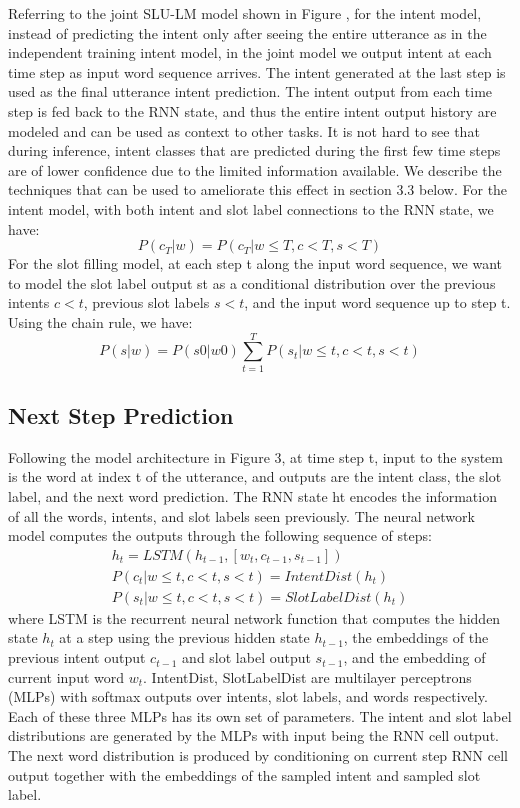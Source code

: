 Referring to the joint SLU-LM model shown in
Figure , for the intent model, instead of predicting
the intent only after seeing the entire utterance
as in the independent training intent model, in the joint model we output intent at each
time step as input word sequence arrives. The intent
generated at the last step is used as the final
utterance intent prediction. The intent output from
each time step is fed back to the RNN state, and
thus the entire intent output history are modeled
and can be used as context to other tasks. It is
not hard to see that during inference, intent classes
that are predicted during the first few time steps
are of lower confidence due to the limited information
available. We describe the techniques that
can be used to ameliorate this effect in section 3.3
below. For the intent model, with both intent and
slot label connections to the RNN state, we have:
\begin{equation}
P(c_T |w) = P(c_T|w \le T,c < T,s < T)
\end{equation}
For the slot filling model, at each step t along the
input word sequence, we want to model the slot
label output st as a conditional distribution over
the previous intents $c<t$, previous slot labels $s<t$,
and the input word sequence up to step t. Using the chain rule, we have:
\begin{equation}
P(s|w) = P(s0|w0) \sum_{t=1}^{T} P(s_t|w≤t, c<t, s<t)
\end{equation}


\subsection{Next Step Prediction}
Following the model architecture in Figure 3, at
time step t, input to the system is the word at index
t of the utterance, and outputs are the intent
class, the slot label, and the next word prediction.
The RNN state ht encodes the information of all
the words, intents, and slot labels seen previously.
The neural network model computes the outputs
through the following sequence of steps:
\begin{eqnarray}
h_t = LSTM(h_{t−1}, [w_t, c_{t−1}, s_{t−1}]) \\
P(c_t|w≤t, c<t, s<t) = IntentDist(h_t) \\
P(s_t|w≤t, c<t, s<t) = SlotLabelDist(h_t)
\end{eqnarray}
where LSTM is the recurrent neural network function
that computes the hidden state $h_t$ at a step
using the previous hidden state $h_{t−1}$, the embeddings
of the previous intent output $c_{t−1}$ and
slot label output $s_{t−1}$, and the embedding of current input word $w_t$. IntentDist, SlotLabelDist are multilayer perceptrons (MLPs) with softmax outputs over intents, slot labels, and words respectively. Each of these three MLPs has
its own set of parameters. The intent and slot label
distributions are generated by the MLPs with input
being the RNN cell output. The next word distribution
is produced by conditioning on current step
RNN cell output together with the embeddings of
the sampled intent and sampled slot label.

